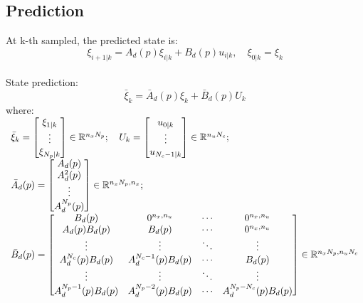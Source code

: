 \documentclass[12pt]{article}
\begin{document}
    \subsection{Prediction}
        At k-th sampled, the predicted state is:
        \begin{equation}
            \xi_{i+1|k} = A_d(p) \xi_{i|k} + B_d(p) u_{i|k}, \quad \xi_{0|k} = \xi_{k}
        \end{equation}
        \\
        State prediction:
        \begin{equation}
            \bar{\xi}_{k} = \bar{A}_d(p) \xi_k + \bar{B}_d(p) U_k
        \end{equation}
        where:  $ \begin{array}[t]{l}
                    \bar{\xi}_{k} = \begin{bmatrix} \xi_{1|k} \\ \vdots \\ \xi_{N_p|k}  \end{bmatrix} \in \mathbb{R}^{n_x N_p}; \quad
                    U_k = \begin{bmatrix} u_{0|k} \\ \vdots \\ u_{N_c-1|k}  \end{bmatrix} \in \mathbb{R}^{n_u N_c};
                    \\
                    \bar{A}_d(p) = \begin{bmatrix} A_d(p) \\ A_d^2(p) \\ \vdots \\ A_d^{N_p}(p)  \end{bmatrix} \in \mathbb{R}^{n_x N_p,n_x}; \\
                    \bar{B}_d(p) = \begin{bmatrix} 
                                    B_d(p) & 0^{n_x,n_u} & \cdots & 0^{n_x,n_u} \\ 
                                    A_d(p) B_d(p) & B_d(p) & \cdots & 0^{n_x,n_u} \\ 
                                    \vdots & \vdots & \ddots & \vdots \\ 
                                    A_d^{N_c}(p) B_d(p) & A_d^{N_c-1}(p) B_d(p) & \cdots & B_d(p) \\ 
                                    \vdots & \vdots & \ddots & \vdots \\ 
                                    A_d^{N_p-1}(p) B_d(p) & A_d^{N_p-2}(p) B_d(p) & \cdots & A_d^{N_p-N_c}(p) B_d(p) \\ 
                                \end{bmatrix} \in \mathbb{R}^{n_x N_p,n_u N_c} \\
                \end{array} $ \\
\end{document}
